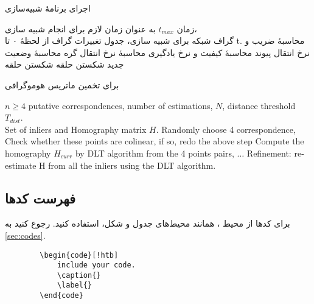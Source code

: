 \begin{algorithm}[!htb]
	\caption{اجرای برنامهٔ شبیه‌سازی}
	\label{alg:simulation-random}
	\begin{algorithmic}[1]
		\REQUIRE زمان $t_{max}$ به عنوان زمان لازم برای انجام شبیه سازی،\\
		\REQUIRE  گراف شبکه برای شبیه سازی،
		\ENSURE جدول تغییرات گراف از لحظهٔ ۰ تا t.
		\STATE محاسبهٔ ضریب و نرخ انتقال پیوند
		\STATE محاسبهٔ کیفیت و نرخ یادگیری
		\ENDFOR
		\STATE محاسبهٔ نرخ انتقال گره
		\STATE محاسبهٔ وضعیت جدید
		\ENDFOR
		\STATE شکستن حلقه
		\STATE شکستن حلقه
		\ENDIF
		\ENDFOR
	\end{algorithmic}
\end{algorithm}

\begin{algorithm}[!htb]
	\caption{ برای تخمین ماتریس هوموگرافی}
	\label{alg:RANSAC}
	\begin{latin}
		\begin{algorithmic}[1]
			\REQUIRE $n\geq4$ putative correspondences, number of estimations, $N$, distance threshold $T_{dist}$.\\
			\ENSURE Set of inliers and Homography matrix $H$.
			\STATE Randomly choose 4 correspondence,
			\STATE Check whether these points are colinear, if so, redo the above step
			\STATE Compute the homography $H_{curr}$ by DLT algorithm from the 4 points pairs,
			\STATE $\ldots$ %
			\ENDFOR
			\STATE Refinement: re-estimate H from all the inliers using the DLT algorithm.
		\end{algorithmic}
	\end{latin}
\end{algorithm}

\subsection{فهرست کدها}
برای کدها از محیط
،
همانند محیط‌های جدول و شکل، استفاده کنید. رجوع کنید به
\autoref{sec:codes}.
\begin{latin}
	\begin{verbatim}
		\begin{code}[!htb]
		    include your code.
		    \caption{}
		    \label{}
		\end{code}
	\end{verbatim}
\end{latin}

